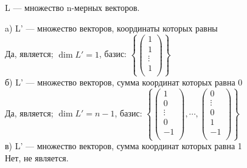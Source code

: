 \begin{prim} %
L --- множество n-мерных векторов. %
\end{prim}
a) L' --- множество векторов, координаты которых равны\\
Да, является;  $\dim L'=1$, базис: %
$\left\{
\begin{pmatrix} %
1\\ 
1\\ 
\vdots\\
1\\ 
\end{pmatrix}
\right\}$\\
б) L' --- множество векторов,  сумма координат которых равна 0\\
Да, является;  $\dim  L'=n-1$, базис: 
$
\left\{ %
\begin{pmatrix} %
1\\ 
0\\ 
\vdots\\ 
0\\ 
-1\\
\end{pmatrix}
, \cdots ,
\begin{pmatrix}
0\\ 
\vdots\\ 
0\\ 
1\\ 
-1\\
\end{pmatrix}
\right\}$\\
в) L' --- множество векторов,  сумма координат которых равна 1\\
Нет, не является.\\

